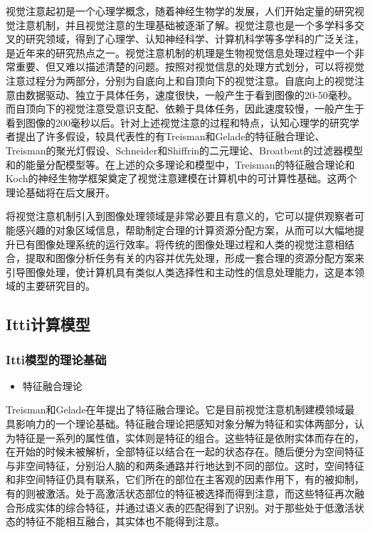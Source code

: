 \documentclass[a4paper,10pt]{article}\large
\begin{document}
视觉注意起初是一个心理学概念，随着神经生物学的发展，人们开始定量的研究视觉注意机制，并且视觉注意的生理基础被逐渐了解。视觉注意也是一个多学科多交叉的研究领域，得到了心理学、认知神经科学、计算机科学等多学科的广泛关注，是近年来的研究热点之一。视觉注意机制的机理是生物视觉信息处理过程中一个非常重要、但又难以描述清楚的问题。按照对视觉信息的处理方式划分，可以将视觉注意过程分为两部分，分别为自底向上和自顶向下的视觉注意。自底向上的视觉注意由数据驱动、独立于具体任务，速度很快，一般产生于看到图像的20-50毫秒。而自顶向下的视觉注意受意识支配、依赖于具体任务，因此速度较慢，一般产生于看到图像的200毫秒以后。针对上述视觉注意的过程和特点，认知心理学的研究学者提出了许多假设，较具代表性的有\cite{4:article}Treisman和Gelade的特征融合理论、Treisman的聚光灯假设、Schneider和Shiffrin的二元理论、Broatbent的过滤器模型和的能量分配模型等。在上述的众多理论和模型中，Treisman的特征融合理论和Koch的神经生物学框架\cite{5:article}奠定了视觉注意建模在计算机中的可计算性基础。这两个理论基础将在后文展开。


将视觉注意机制引入到图像处理领域是非常必要且有意义的，它可以提供观察者可能感兴趣的对象区域信息，帮助制定合理的计算资源分配方案，从而可以大幅地提升已有图像处理系统的运行效率。将传统的图像处理过程和人类的视觉注意相结合，提取和图像分析任务有关的内容并优先处理，形成一套合理的资源分配方案来引导图像处理，使计算机具有类似人类选择性和主动性的信息处理能力，这是本领域的主要研究目的。


\subsection{Itti计算模型}

\subsubsection{Itti模型的理论基础}

\begin{itemize}
\item 特征融合理论
\end{itemize} 

Treisman和Gelade在年提出了特征融合理论。它是目前视觉注意机制建模领域最具影响力的一个理论基础。特征融合理论把感知对象分解为特征和实体两部分，认为特征是一系列的属性值，实体则是特征的组合。这些特征是依附实体而存在的，在开始的时候未被解析，全部特征以结合在一起的状态存在。随后便分为空间特征与非空间特征，分别沿人脑的和两条通路并行地达到不同的部位。这时，空间特征和非空间特征仍具有联系，它们所在的部位在主客观的因素作用下，有的被抑制，有的则被激活。处于高激活状态部位的特征被选择而得到注意，而这些特征再次融合形成实体的综合特征，并通过语义表的匹配得到了识别。对于那些处于低激活状态的特征不能相互融合，其实体也不能得到注意。
\end{document}
